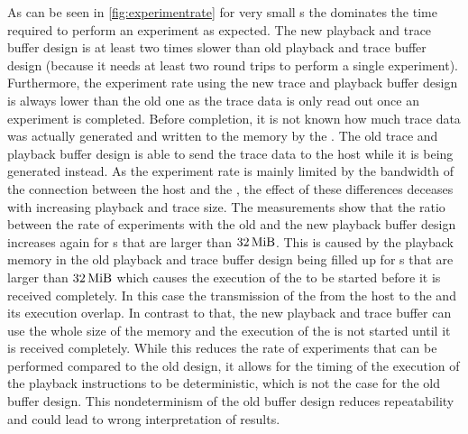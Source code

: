 As can be seen in \autoref{fig:experimentrate} for very small \PlaybackProgram{}s the \rtt{} dominates the time required to perform an experiment as expected. The new playback and trace buffer design is at least two times slower than old playback and trace buffer design (because it needs at least two round trips to perform a single experiment). Furthermore, the experiment rate using the new trace and playback buffer design is always lower than the old one as the trace data is only read out once an experiment is completed. Before completion, it is not known how much trace data was actually generated and written to the \DDR{} memory by the \AXIDMA{}. The old trace and playback buffer design is able to send the trace data to the host while it is being generated instead. As the experiment rate is mainly limited by the bandwidth of the connection between the host and the \FPGA{}, the effect of these differences deceases with increasing playback and trace size.
The measurements show that the ratio between the rate of experiments with the old and the new playback buffer design increases again for \PlaybackProgram{}s that are larger than $\SI{32}{\mebi\byte}$. This is caused by the playback memory in the old playback and trace buffer design being filled up for \PlaybackProgram{}s that are larger than $\SI{32}{\mebi\byte}$ which causes the execution of the \PlaybackProgram{} to be started before it is received completely. In this case the transmission of the \PlaybackProgram{} from the host to the \FPGA{} and its execution overlap.
In contrast to that, the new playback and trace buffer can use the whole size of the \DDR{} memory and the execution of the \PlaybackProgram{} is not started until it is received completely. While this reduces the rate of experiments that can be performed compared to the old design, it allows for the timing of the execution of the playback instructions to be deterministic, which is not the case for the old buffer design. This nondeterminism of the old buffer design reduces repeatability and could lead to wrong interpretation of results.


